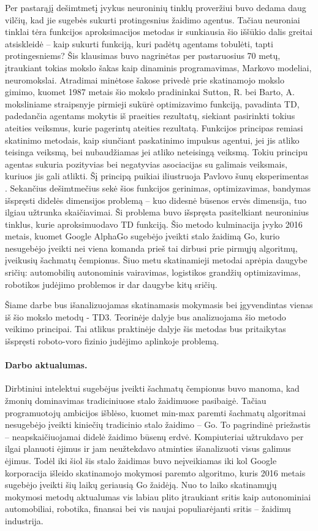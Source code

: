 \documentclass[a4paper, 12pt]{article}
\begin{document}
Per pastarąjį dešimtmetį įvykus neuroninių tinklų proveržiui buvo dedama daug vilčių, kad jie sugebės sukurti protingesnius žaidimo agentus. Tačiau neuroniai tinklai tėra funkcijos aproksimacijos metodas ir sunkiausia šio iššūkio dalis greitai atsiskleidė – kaip sukurti funkciją, kuri padėtų agentams tobulėti, tapti protingesniems? Šis klausimas buvo nagrinėtas per pastaruosius 70 metų, įtraukiant tokias mokslo šakas kaip dinaminis programavimas, Markovo modeliai, neuromokslai. Atradimai minėtose šakose privedė prie skatinamojo mokslo gimimo, kuomet 1987 metais šio mokslo pradininkai Sutton, R. bei Barto, A. moksliniame straipsnyje \cite{TDSutton} pirmieji sukūrė optimizavimo funkciją, pavadinta TD, padedančia agentams mokytis iš praeities rezultatų, siekiant pasirinkti tokius ateities veiksmus, kurie pagerintų ateities rezultatą. Funkcijos principas remiasi skatinimo metodais, kaip siunčiant paskatinimo impulsus agentui, jei jis atliko teisinga veiksmą, bei nubaudžiamas jei atliko neteisingą veiksmą. Tokiu principu agentas sukuria pozityvias bei negatyvias asociacijas su galimais veiksmais, kuriuos jis gali atlikti. Šį principą puikiai iliustruoja Pavlovo šunų eksperimentas \cite{Pavlov}. Sekančius dešimtmečius sekė šios funkcijos gerinimas, optimizavimas, bandymas išspręsti didelės dimensijos problemą – kuo didesnė būsenos ervės dimensija, tuo ilgiau užtrunka skaičiavimai. Ši problema buvo išspręsta pasitelkiant neuroninius tinklus, kurie aproksimuodavo TD funkciją. Šio metodo kulminacija įvyko 2016 metais, kuomet Google AlphaGo sugebėjo įveikti stalo žaidimą Go, kurio nesugebėjo įveikti nei viena komanda prieš tai dirbusi prie pirmųjų algoritmų, įveikusių šachmatų čempionus. Šiuo metu skatinamieji metodai aprėpia daugybe sričių: automobilių autonominis vairavimas, logistikos grandžių optimizavimas, robotikos judėjimo problemos ir dar daugybe kitų sričių. 

Šiame darbe bus išanalizuojamas skatinamasis mokymasis bei įgyvendintas vienas iš šio mokslo metodų - TD3. Teorinėje dalyje bus analizuojama šio metodo veikimo principai. Tai atlikus praktinėje dalyje šis metodas bus pritaikytas išspręsti roboto-voro fizinio judėjimo aplinkoje problemą.

%
\paragraph{Darbo aktualumas.} Dirbtiniui intelektui sugebėjus įveikti šachmatų čempionus buvo manoma, kad žmonių dominavimas tradiciniuose stalo žaidimuose pasibaigė. Tačiau programuotojų ambicijos išblėso, kuomet min-max paremti šachmatų algoritmai nesugebėjo įveikti kiniečių tradicinio stalo žaidimo – Go. To pagrindinė priežastis – neapskaičiuojamai didelė žaidimo būsenų erdvė. Kompiuteriai užtrukdavo per ilgai planuoti ėjimus ir jam neužtekdavo atminties išanalizuoti visus galimus ėjimus. Todėl iki šiol šis stalo žaidimas buvo neįveikiamas iki kol Google korporacija išleido skatinamojo mokymosi paremto algoritmo, kuris 2016 metais sugebėjo įveikti šių laikų geriausią Go žaidėją. Nuo to laiko skatinamųjų mokymosi metodų aktualumas vis labiau plito įtraukiant sritis kaip autonominiai automobiliai, robotika, finansai bei vis naujai populiarėjanti sritis – žaidimų industrija. 
%
\end{document}
